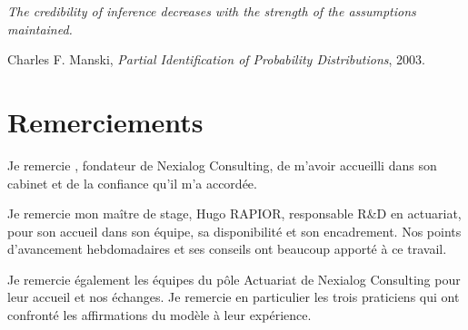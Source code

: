 \begin{flushright}
\begin{minipage}{0.72\textwidth}
\itshape{} 
The credibility of inference decreases with the strength of the assumptions
maintained.

\vspace{10pt}
\normalfont\small\raggedleft
Charles F. Manski, \emph{Partial Identification of Probability Distributions}, 2003.
\end{minipage}
\end{flushright}

\clearpage

\chapter*{Remerciements}

Je remercie \fondateurnexialog, fondateur de Nexialog Consulting, de m'avoir accueilli dans
son cabinet et de la confiance qu'il m'a accordée.

Je remercie mon maître de stage, Hugo RAPIOR, responsable R\&D en actuariat, pour son accueil
dans son équipe, sa disponibilité et son encadrement. Nos points d'avancement hebdomadaires et
ses conseils ont beaucoup apporté à ce travail.

Je remercie également les équipes du pôle Actuariat de Nexialog Consulting pour leur accueil et
nos échanges. Je remercie en particulier les trois praticiens qui ont confronté les affirmations
du modèle à leur expérience.

